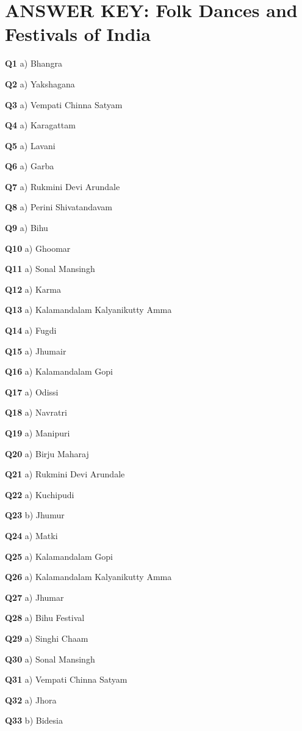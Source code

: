 \section{ANSWER KEY: Folk Dances and Festivals of India}

\textbf{Q1} a) Bhangra\par
\textbf{Q2} a) Yakshagana\par
\textbf{Q3} a) Vempati Chinna Satyam\par
\textbf{Q4} a) Karagattam\par
\textbf{Q5} a) Lavani\par
\textbf{Q6} a) Garba\par
\textbf{Q7} a) Rukmini Devi Arundale\par
\textbf{Q8} a) Perini Shivatandavam\par
\textbf{Q9} a) Bihu\par
\textbf{Q10} a) Ghoomar\par
\textbf{Q11} a) Sonal Mansingh\par
\textbf{Q12} a) Karma\par
\textbf{Q13} a) Kalamandalam Kalyanikutty Amma\par
\textbf{Q14} a) Fugdi\par
\textbf{Q15} a) Jhumair\par
\textbf{Q16} a) Kalamandalam Gopi\par
\textbf{Q17} a) Odissi\par
\textbf{Q18} a) Navratri\par
\textbf{Q19} a) Manipuri\par
\textbf{Q20} a) Birju Maharaj\par
\textbf{Q21} a) Rukmini Devi Arundale\par
\textbf{Q22} a) Kuchipudi\par
\textbf{Q23} b) Jhumur\par
\textbf{Q24} a) Matki\par
\textbf{Q25} a) Kalamandalam Gopi\par
\textbf{Q26} a) Kalamandalam Kalyanikutty Amma\par
\textbf{Q27} a) Jhumar\par
\textbf{Q28} a) Bihu Festival\par
\textbf{Q29} a) Singhi Chaam\par
\textbf{Q30} a) Sonal Mansingh\par
\textbf{Q31} a) Vempati Chinna Satyam\par
\textbf{Q32} a) Jhora\par
\textbf{Q33} b) Bidesia\par
